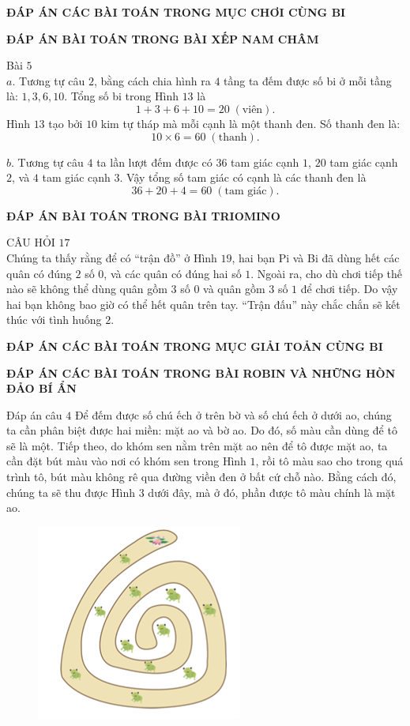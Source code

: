 \graphicspath{{../loigiai/pic/}}

\begin{center}
	\textbf{ĐÁP ÁN CÁC BÀI TOÁN TRONG MỤC CHƠI CÙNG BI}
\end{center}
\begin{center}
	\textbf{ĐÁP ÁN BÀI TOÁN TRONG BÀI XẾP NAM CHÂM}
\end{center}
Bài $5$\\
$a.$	Tương tự câu $2$, bằng cách chia hình ra $4$ tầng ta đếm được số bi ở mỗi tầng là: $1,3,6,10$. Tổng số bi trong Hình $13$ là
$$1+3+6+10= 20 \;(\text{viên}).$$
Hình $13$ tạo bởi $10$ kim tự tháp mà mỗi cạnh là một thanh đen. Số thanh đen là: 
$$10\times 6=60 \;(\text{thanh}).$$

$b.$	Tương tự câu $4$ ta lần lượt đếm được có $36$ tam  giác cạnh $1$, $20$ tam giác cạnh $2$, và $4$ tam giác cạnh $3$. Vậy tổng số tam giác có cạnh là các thanh đen là 
$$36+20+4=60  \;(\text{tam giác}).$$
\begin{center}
	\textbf{ĐÁP ÁN BÀI TOÁN TRONG BÀI TRIOMINO}
\end{center}
CÂU HỎI $17$\\
Chúng ta thấy rằng để có “trận đồ” ở Hình $19$, hai bạn Pi và Bi đã dùng hết các quân có đúng $2$ số $0$, và các quân có đúng hai số $1$. Ngoài ra, cho dù chơi tiếp thế nào sẽ không thể dùng quân gồm $3$ số $0$ và quân gồm $3$ số $1$ để chơi tiếp. Do vậy hai bạn không bao giờ có thể hết quân trên tay. “Trận đấu” này chắc chắn sẽ kết thúc với tình huống $2$.
\newpage
\newpage
\begin{center}
	\textbf{ĐÁP ÁN CÁC BÀI TOÁN TRONG MỤC GIẢI TOẢN CÙNG BI}
\end{center}
\begin{center}
	\textbf{ĐÁP ÁN CÁC BÀI TOÁN TRONG BÀI ROBIN VÀ NHỮNG HÒN ĐẢO BÍ ẨN}
\end{center}
Đáp án câu $4$
\vskip 0.1cm
Để đếm được số chú ếch ở trên bờ và số chú ếch ở dưới ao, chúng ta cần phân biệt được hai miền: mặt ao và bờ ao. Do đó, số màu cần dùng để tô sẽ là một. Tiếp theo, do khóm sen nằm trên mặt ao nên để tô được mặt ao, ta cần đặt bút màu vào nơi có khóm sen trong Hình $1$, rồi tô màu sao cho trong quá trình tô, bút màu không rê qua đường viền đen ở bất cứ chỗ nào. Bằng cách đó, chúng ta sẽ thu được Hình $3$ dưới đây, mà ở đó, phần được tô màu chính là mặt ao. 
\begin{figure}[H]
	\centering
	\vspace*{-5pt}
	\captionsetup{labelformat= empty, justification=centering}
	\includegraphics[width=0.4\linewidth]{1}
	\vspace*{-15pt}
\end{figure}
